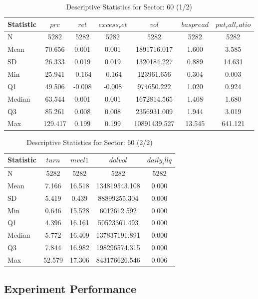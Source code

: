     \begin{table}[H]
    \centering

    
    \caption{Descriptive Statistics for Sector: 60 (1/2)}
    \label{tab:sec60_a}
    
    \begin{tabular}{lcccccc}
    \toprule
    Statistic & $prc$ & $ret$ & $excess_ret$ & $vol$ & $baspread$ & $put_call_ratio$ \\\midrule
    N & 5282 & 5282 & 5282 & 5282 & 5282 & 5282 \\
    Mean & 70.656 & 0.001 & 0.001 & 1891716.017 & 1.600 & 3.585 \\
    SD & 26.333 & 0.019 & 0.019 & 1320184.227 & 0.889 & 14.631 \\
    Min & 25.941 & -0.164 & -0.164 & 123961.656 & 0.304 & 0.003 \\
    Q1 & 49.506 & -0.008 & -0.008 & 974650.222 & 1.020 & 0.924 \\
    Median & 63.544 & 0.001 & 0.001 & 1672814.565 & 1.408 & 1.680 \\
    Q3 & 85.261 & 0.008 & 0.008 & 2356931.009 & 1.944 & 3.019 \\
    Max & 129.417 & 0.199 & 0.199 & 10891439.527 & 13.545 & 641.121 \\
    \bottomrule
    \end{tabular}

    \end{table}
    
    \begin{table}[H]
    \centering

    
    \caption{Descriptive Statistics for Sector: 60 (2/2)}
    \label{tab:sec60_b}
    
    \begin{tabular}{lcccc}
    \toprule
    Statistic & $turn$ & $mvel1$ & $dolvol$ & $daily_illq$ \\\midrule
    N & 5282 & 5282 & 5282 & 5282 \\
    Mean & 7.166 & 16.518 & 134819543.108 & 0.000 \\
    SD & 5.419 & 0.439 & 88899255.304 & 0.000 \\
    Min & 0.646 & 15.528 & 6012612.592 & 0.000 \\
    Q1 & 4.396 & 16.161 & 50523361.493 & 0.000 \\
    Median & 5.772 & 16.409 & 137837191.891 & 0.000 \\
    Q3 & 7.844 & 16.982 & 198296574.315 & 0.000 \\
    Max & 52.579 & 17.306 & 843176626.546 & 0.006 \\
    \bottomrule
    \end{tabular}

    \end{table}
  
\subsection{Experiment Performance}
\clearpage
\begin{landscape}

\end{landscape}
\clearpage